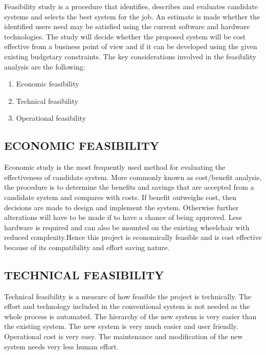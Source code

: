 \documentclass[12pt]{report} %
\begin{document}
Feasibility study is a procedure that identifies, describes and evaluates candidate systems and selects the best system for the job. An estimate is made whether the identified users need may be satisfied using the current software and hardware technologies. The study will decide whether the proposed system will be cost effective from a business point of view and if it can be developed using the given existing budgetary constraints. 
The key considerations involved in the feasibility analysis are the following:


\begin{enumerate}
	\item Economic feasibility
	\item Technical feasibility
	\item Operational feasibility
\end{enumerate}


\subsection{ECONOMIC FEASIBILITY}
\label{subsec:ECONOMIC FEASIBILITY}

Economic study is the most frequently used method for evaluating the effectiveness of candidate system. More commonly known as cost/benefit analysis, the procedure is to determine the benefits and savings that are accepted from a candidate system and compares with costs. If benefit outweighs cost, then decisions are made to design and implement the system. Otherwise further alterations will have to be made if to have a chance of being approved.
Less hardware is required and can also be mounted on the existing wheelchair with reduced complexity.Hence this project is economically feasible and is cost effective because of its compatibility and effort saving nature.


\subsection{TECHNICAL FEASIBILITY}
\label{subsec:TECHNICAL FEASIBILITY}

Technical feasibility is a measure of how feasible the project is technically. The effort and technology included in the conventional system is not needed as the whole process is automated.
The hierarchy of the new system is very easier than the existing system. The new system is very much easier and user friendly. Operational cost is very easy. The maintenance and modification of the new system needs very less human effort. 
\end{document}
